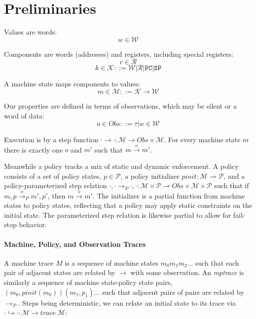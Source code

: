 \documentclass{article}
\begin{document}
  \section{Preliminaries}

    Values are words:
    \[w \in \mathcal{W}\]

    Components are words (addresses) and registers, including special registers:
    \[r \in \mathcal{R}\]
    \[k \in \mathcal{K} ::= \mathcal{W} | \mathcal{R} | \mathtt{PC} | \mathtt{SP}\]

    A machine state maps components to values:
    \[m \in \mathcal{M} ::= \mathcal{K} \rightarrow \mathcal{W}\]

    Our properties are defined in terms of observations, which may be silent or a word of data:
    \[o \in \mathit{Obs} ::= \tau | w \in \mathcal{W}\]
    
    Execution is by a step function \(\cdot \xrightarrow{\cdot} \cdot : \mathcal{M} \rightarrow
    \mathit{Obs} \times \mathcal{M}\). For every machine state \(m\) there is exactly one \(o\) and \(m'\)
    such that \(m \xrightarrow{o} m'\).

    Meanwhile a policy tracks a mix of static and dynamic enforcement. A policy consists of
    a set of policy states, \(p \in \mathcal{P}\), a policy initializer
    \(pinit : \mathcal{M} \rightharpoonup \mathcal{P}\), and a policy-parameterized step relation
    \(\cdot, \cdot \xrightarrow{\cdot}_P \cdot, \cdot : \mathcal{M} \times \mathcal{P} \rightharpoonup
    \mathit{Obs} \times \mathcal{M} \times \mathcal{P}\) such that if \(m,p \xrightarrow{o}_P m',p'\),
    then \(m \xrightarrow{o} m'\). The initializer is a partial function from machine states to policy
    states, reflecting that a policy may apply static constraints on the initial state. The parameterized
    step relation is likewise partial to allow for fail-stop behavior.

  \paragraph{Machine, Policy, and Observation Traces}

    A machine trace \(M\) is a sequence of machine states \(m_0 m_1 m_2 \dots\) such that each
    pair of adjacent states are related by \(\longrightarrow\) with some observation. An
    {\it mptrace} is similarly a sequence of machine state-policy state pairs,
    \((m_0,\mathit{pinit}(m_0))(m_1,p_1) \dots\) such that adjacent pairs of pairs are related
    by \(\longrightarrow_P\). Steps being deterministic, we can relate an initial state to its trace
    via \(\cdot \hookrightarrow \cdot : \mathcal{M} \rightarrow \mathit{trace}\ \mathcal{M}\):
\end{document}
